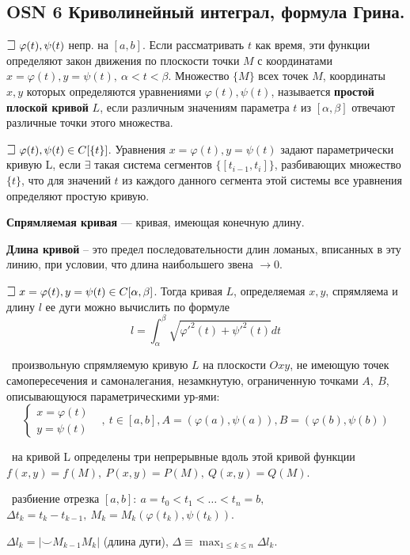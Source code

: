 \subsection*{OSN 6 Криволинейный интеграл, формула Грина.}

$\mathLet ~ \varphi(t), \psi(t)$ непр. на $[a,b]$. 
Если рассматривать $t$ как время, эти функции определяют закон движения по плоскости точки $M$ с координатами 
$x = \varphi(t), y = \psi(t), ~ \alpha < t < \beta$. Множество $\{M\}$ всех точек $M$, координаты $x,y$ которых определяются уравнениями $\varphi(t), \psi(t)$, называется \textbf{простой плоской кривой} $L$, если различным значениям параметра $t$ из $[\alpha, \beta]$ отвечают различные точки этого множества.

$\mathLet ~ \varphi(t), \psi(t) \in C[\{t\}]$. Уравнения $x = \varphi(t), y = \psi(t)$ задают параметрически кривую L, если $\exists$ такая система сегментов $\{[t_{i-1}, t_i]\}$, разбивающих множество $\{t\}$, что для значений $t$ из каждого данного сегмента этой системы все уравнения определяют простую кривую.

\textbf{Спрямляемая кривая} --- кривая, имеющая конечную длину.

\textbf{Длина кривой} -- это предел последовательности длин ломаных, вписанных в эту линию, при условии, что длина наибольшего звена $\rightarrow 0$.

\bigbreak
$\mathLet ~ x = \varphi(t), y = \psi(t) \in C[\alpha, \beta]$. Тогда кривая $L$, определяемая $x, y$, спрямляема и длину $l$ ее дуги можно вычислить по формуле
$$l = \int^{\beta}_{\alpha} \sqrt{\varphi'^2(t) + \psi'^2(t)}dt$$

\faEye \ произвольную спрямляемую кривую $L$ на плоскости $Oxy$, не имеющую точек самопересечения и самоналегания, незамкнутую, ограниченную точками $A,~B$, описывающуюся параметрическими ур-ями:
$$\begin{cases} x=\varphi(t)&\\ y=\psi(t)\end{cases},~t\in [a,b], A=(\varphi(a),\psi(a)), B=(\varphi(b),\psi(b))$$

\mathLet \ на кривой L определены три непрерывные вдоль этой кривой функции $f(x,y)=f(M),~P(x,y)=P(M),~Q(x,y)=Q(M)$.

\faEye \ разбиение отрезка 
$[a,b]:~a=t_0 < t_1 < \dots < t_n = b,~$
$\Delta t_k = t_k-t_{k-1}, ~ M_k = M_k(\varphi(t_k),\psi(t_k))$.

$\Delta l_k = |\smile M_{k-1}M_k|$ (длина дуги), $\Delta \equiv \displaystyle\max_{1\leqslant k\leqslant n} \Delta l_k$.

